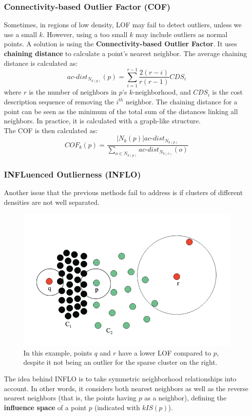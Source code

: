 \subsubsection{Connectivity-based Outlier Factor (COF)}

Sometimes, in regions of low density, LOF may fail to detect outliers, unless we use a small $k$. However, using a too small $k$ may include outliers as normal points. A solution is using the \textbf{Connectivity-based Outlier Factor}. It uses \textbf{chaining distance} to calculate a point's nearest neighbor. The average chaining distance is calculated as:
\begin{equation*}
    \textit{ac-dist}_{N_{k(p)}}(p) = \sum_{i=1}^{r-1} \dfrac{2(r-i)}{r(r-1)} CDS_i
\end{equation*}
where $r$ is the number of neighbors in $p$'s $k$-neighborhood, and $CDS_i$ is the cost description sequence of removing the $i^{th}$ neighbor. The chaining distance for a point can be seen as the minimum of the total sum of the distances linking all neighbors. In practice, it is calculated with a graph-like structure. \\
The COF is then calculated as:
\begin{equation*}
    \textit{COF}_k(p) = \dfrac{|N_k(p)| \textit{ac-dist}_{N_{k(p)}}}{\sum_{o \in N_{k(p)}} \textit{ac-dist}_{N_{k(o)}}(o)}
\end{equation*}

\subsubsection{INFLuenced Outlierness (INFLO)}

Another issue that the previous methods fail to address is if clusters of different densities are not well separated.
\begin{figure}[h]
    \centering
    \includegraphics[width=0.5\linewidth]{img/inflo.png}
    \caption{In this example, points $q$ and $r$ have a lower LOF compared to $p$, despite it not being an outlier for the sparse cluster on the right.}
    \label{fig:inflo}
\end{figure}
The idea behind INFLO is to take symmetric neighborhood relationships into account. In other words, it considers both nearest neighbors as well as the reverse nearest neighbors (that is, the points having $p$ as a neighbor), defining the \textbf{influence space} of a point $p$ (indicated with $kIS(p)$).

